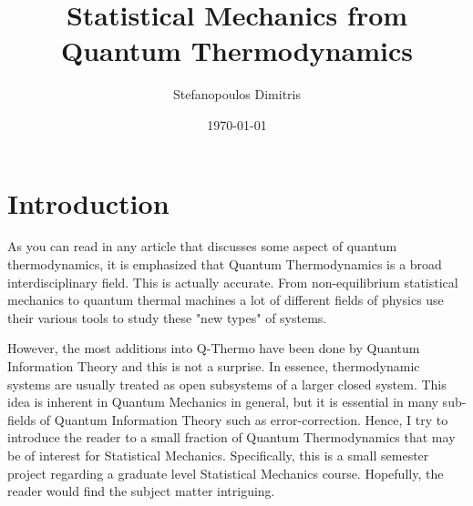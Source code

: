 \documentclass[a4paper,12pt]{article}
\begin{document}
\pagestyle{empty}
\title{Statistical Mechanics from Quantum Thermodynamics}
\author{Stefanopoulos Dimitris}
\date{\today}
\maketitle
\pagestyle{plain}

\section{Introduction} \par  As you can read in any article that discusses some aspect of quantum thermodynamics, it is emphasized that Quantum Thermodynamics is a broad interdisciplinary field. This is actually accurate. From non-equilibrium statistical mechanics to quantum thermal machines a lot of different fields of physics use their various tools to study these "new types" of systems. \par However, the most additions into Q-Thermo have been done by Quantum Information Theory and this is not a surprise. In essence, thermodynamic systems are usually treated as open subsystems of a larger closed system. This idea is inherent in Quantum Mechanics in general, but it is essential in many sub-fields of Quantum Information Theory such as error-correction. Hence, I try to introduce the reader to a small fraction of Quantum Thermodynamics that may be of interest for Statistical Mechanics. Specifically, this is a small semester project regarding a graduate level Statistical Mechanics course. Hopefully, the reader would find the subject matter intriguing.
\end{document}
